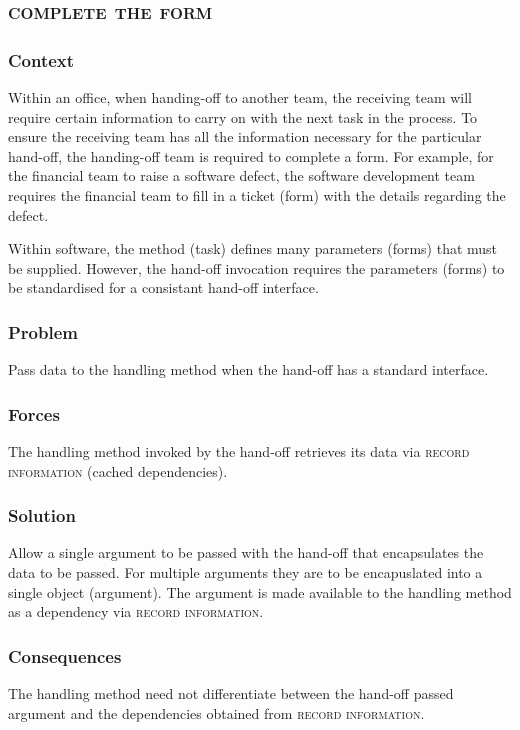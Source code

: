 \documentclass[prodmode]{style/acmlarge}
\begin{document}
\subsection{\textsc{\textbf{complete the form}}}

\subsubsection*{Context} Within an office, when handing-off to another team, the
receiving team will require certain information to carry on with the next task
in the process.  To ensure the receiving team has all the information necessary
for the particular hand-off, the handing-off team is required to complete a
form.  For example, for the financial team to raise a software defect, the
software development team requires the financial team to fill in a ticket (form)
with the details regarding the defect.

Within software, the method (task) defines many parameters (forms) that must be
supplied.  However, the hand-off invocation requires the parameters (forms) to
be standardised for a consistant hand-off interface.

\subsubsection*{\textbf{Problem}} Pass data to the handling method when the hand-off has
a standard interface.

\subsubsection*{Forces} The handling method invoked by the hand-off retrieves
its data via \textsc{record information} (cached dependencies).

\subsubsection*{\textbf{Solution}} Allow a single argument to be passed with the hand-off
that encapsulates the data to be passed.  For multiple arguments they are to be
encapuslated into a single object (argument).  The argument is made available to
the handling method as a dependency via \textsc{record information}.

\subsubsection*{Consequences} The handling method need not differentiate between
the hand-off passed argument and the dependencies obtained from \textsc{record
information}.
\end{document}
